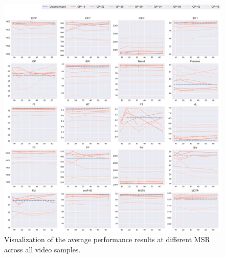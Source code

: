 \begin{figure}[!htbp]
  \centering
  \includegraphics[width=1.0\linewidth]{img/averaged_all_multiplots_msr.pdf}
  \caption[Visualization of the averaged performance results at different MSR of all video samples]
  {Visualization of the average performance results at different MSR across all video samples.}
  \label{fig:averaged_result_all_multiplots_msr}
\end{figure}